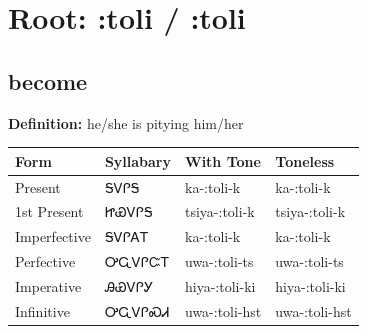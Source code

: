 \documentclass{article}%
\begin{document}
%
\normalsize%
\section*{Root: :toli / :toli}%
\subsection*{become}%
\textbf{Definition: }%
he/she is pitying him/her%
\\[0.5em]%
\begin{tabular}{|l|l|l|l|}%
\hline%
\textbf{Form}&\textbf{Syllabary}&\textbf{With Tone}&\textbf{Toneless}\\%
\hline%
Present&ᎦᏙᎵᎦ&ka{-}:toli{-}k&ka{-}:toli{-}k\\%
1st Present&ᏥᏯᏙᎵᎦ&tsiya{-}:toli{-}k&tsiya{-}:toli{-}k\\%
Imperfective&ᎦᏙᎵᎪᎢ&ka{-}:toli{-}k&ka{-}:toli{-}k\\%
Perfective&ᎤᏩᏙᎵᏨᎢ&uwa{-}:toli{-}ts&uwa{-}:toli{-}ts\\%
Imperative&ᎯᏯᏙᎵᎩ&hiya{-}:toli{-}ki&hiya{-}:toli{-}ki\\%
Infinitive&ᎤᏩᏙᎵᏍᏗ&uwa{-}:toli{-}hst&uwa{-}:toli{-}hst\\%
\hline%
\end{tabular}%
\\[1em]%
\end{document}

